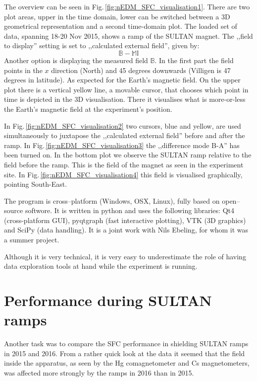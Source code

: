 The overview can be seen in Fig.\,\ref{fig:nEDM_SFC_visualisation1}. There are two plot areas, upper in the time domain, lower can be switched between a 3D geometrical representation and a second time-domain plot. The loaded set of data, spanning 18-20 Nov 2015, shows a ramp of the SULTAN magnet. The ,,field to display'' setting is set to ,,calculated external field'', given by:
\begin{equation}
  \mathbb{B} - \mathbb{M} \mathbb{I}
\end{equation}
Another option is displaying the measured field $\mathbb{B}$.
In the first part the field points in the $x$ direction (North) and 45 degrees downwards (Villigen is 47 degrees in latitude). As expected for the Earth's magnetic field. On the upper plot there is a vertical yellow line, a movable cursor, that chooses which point in time is depicted in the 3D visualisation. There it visualises what is more-or-less the Earth's magnetic field at the experiment's position.

In Fig.\,\ref{fig:nEDM_SFC_visualisation2} two cursors, blue and yellow, are used simultaneously to juxtapose the ,,calculated external field'' before and after the ramp. In Fig.\,\ref{fig:nEDM_SFC_visualisation3} the ,,difference mode B-A'' has been turned on. In the bottom plot we observe the SULTAN ramp relative to the field before the ramp. This is the field of the magnet as seen in the experiment site. In Fig.\,\ref{fig:nEDM_SFC_visualisation4} this field is visualised graphically, pointing South-East.


The program is cross--platform (Windows, OSX, Linux), fully based on open--source softwore. It is written in python and uses the following libraries: Qt4 (cross-platform GUI), pyqtgraph (fast interactive plotting), VTK (3D graphics) and SciPy (data handling). It is a joint work with Nils Ebeling, for whom it was a summer project.

Although it is very technical, it is very easy to underestimate the role of having data exploration tools at hand while the experiment is running.



\section{Performance during SULTAN ramps}
Another task was to compare the SFC performance in shielding SULTAN ramps in 2015 and 2016. From a rather quick look at the data it seemed that the field inside the apparatus, as seen by the Hg comagnetometer and Cs magnetometers, was affected more strongly by the ramps in 2016 than in 2015.

